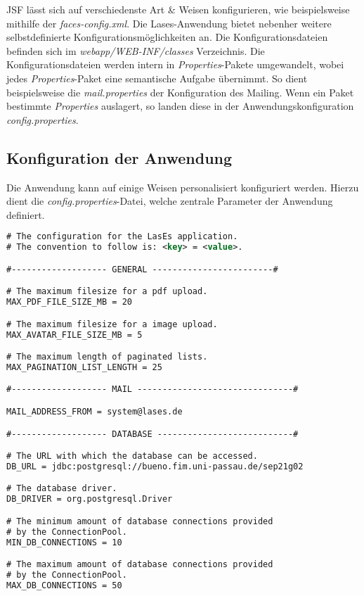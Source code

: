 JSF lässt sich auf verschiedenste Art \& Weisen konfigurieren, wie beispielsweise
mithilfe der \emph{faces-config.xml}.
Die Lases-Anwendung bietet nebenher weitere selbstdefinierte Konfigurationsmöglichkeiten an.
Die Konfigurationsdateien befinden sich im \emph{webapp/WEB-INF/classes} Verzeichnis.
\newline\newline
Die Konfigurationsdateien werden intern in \emph{Properties}-Pakete umgewandelt,
wobei jedes \emph{Properties}-Paket eine semantische Aufgabe übernimmt.
So dient beispielsweise die \emph{mail.properties} der Konfiguration des Mailing.
Wenn ein Paket bestimmte \emph{Properties} auslagert,
so landen diese in der Anwendungskonfiguration \emph{config.properties}.

\subsection{Konfiguration der Anwendung}
Die Anwendung kann auf einige Weisen personalisiert konfiguriert werden.
Hierzu dient die \emph{config.properties}-Datei,
welche zentrale Parameter der Anwendung definiert.

\begin{lstlisting}[language=XML, caption = Die Anwendungskonfiguration \emph{config.properties}]
# The configuration for the LasEs application.
# The convention to follow is: <key> = <value>.

#------------------- GENERAL ------------------------#

# The maximum filesize for a pdf upload.
MAX_PDF_FILE_SIZE_MB = 20

# The maximum filesize for a image upload.
MAX_AVATAR_FILE_SIZE_MB = 5

# The maximum length of paginated lists.
MAX_PAGINATION_LIST_LENGTH = 25

#------------------- MAIL -------------------------------#

MAIL_ADDRESS_FROM = system@lases.de

#------------------- DATABASE ---------------------------#

# The URL with which the database can be accessed.
DB_URL = jdbc:postgresql://bueno.fim.uni-passau.de/sep21g02

# The database driver.
DB_DRIVER = org.postgresql.Driver

# The minimum amount of database connections provided
# by the ConnectionPool.
MIN_DB_CONNECTIONS = 10

# The maximum amount of database connections provided
# by the ConnectionPool.
MAX_DB_CONNECTIONS = 50
\end{lstlisting}

